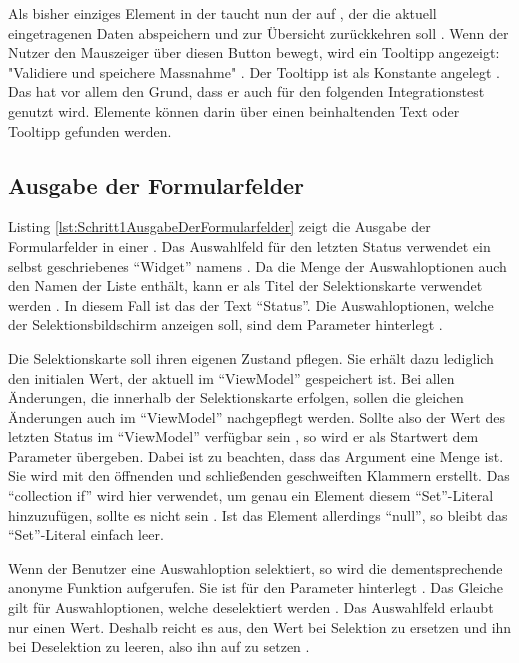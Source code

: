 Als bisher einziges Element in der   taucht nun der  auf ,
der die aktuell eingetragenen Daten abspeichern  und zur Übersicht zurückkehren soll .
Wenn der Nutzer den Mauszeiger über diesen Button bewegt,
wird ein Tooltipp angezeigt: "Validiere und speichere Massnahme" .
Der Tooltipp ist als Konstante angelegt .
Das hat vor allem den Grund,
dass er auch für den folgenden Integrationstest genutzt wird. Elemente können darin über einen beinhaltenden Text oder Tooltipp gefunden werden.




\subsection{Ausgabe der Formularfelder}

Listing \ref{lst:Schritt1AusgabeDerFormularfelder} zeigt die Ausgabe der Formularfelder in einer  .
Das Auswahlfeld für den letzten Status verwendet ein selbst geschriebenes \enquote{Widget} namens  .
Da die Menge der Auswahloptionen auch den Namen der Liste enthält, kann er als Titel der Selektionskarte verwendet werden . In diesem Fall ist das der Text \enquote{Status}.
Die Auswahloptionen, welche der Selektionsbildschirm anzeigen soll, sind dem Parameter  hinterlegt .

Die Selektionskarte soll ihren eigenen Zustand pflegen.
Sie erhält dazu lediglich den initialen Wert, der aktuell im \enquote{ViewModel} gespeichert ist.
Bei allen Änderungen, die innerhalb der Selektionskarte erfolgen, sollen die gleichen Änderungen auch im \enquote{ViewModel} nachgepflegt werden.
Sollte also der Wert des letzten Status im \enquote{ViewModel} verfügbar sein , so wird er als Startwert dem Parameter   übergeben.
Dabei ist zu beachten, dass das Argument eine Menge ist.
Sie wird mit den  öffnenden und schließenden geschweiften Klammern erstellt.
Das \enquote{collection if} wird hier verwendet, um genau ein Element diesem \enquote{Set}-Literal hinzuzufügen, sollte es nicht  sein .
Ist das Element allerdings \enquote{null}, so bleibt das \enquote{Set}-Literal einfach leer.


Wenn der Benutzer eine Auswahloption selektiert, so  wird die dementsprechende anonyme Funktion aufgerufen.
Sie ist für den Parameter  hinterlegt .
Das Gleiche gilt für Auswahloptionen, welche deselektiert werden .
Das Auswahlfeld erlaubt nur einen Wert.
Deshalb reicht es aus, den Wert bei Selektion zu ersetzen und ihn bei Deselektion zu leeren, also ihn auf  zu setzen .


